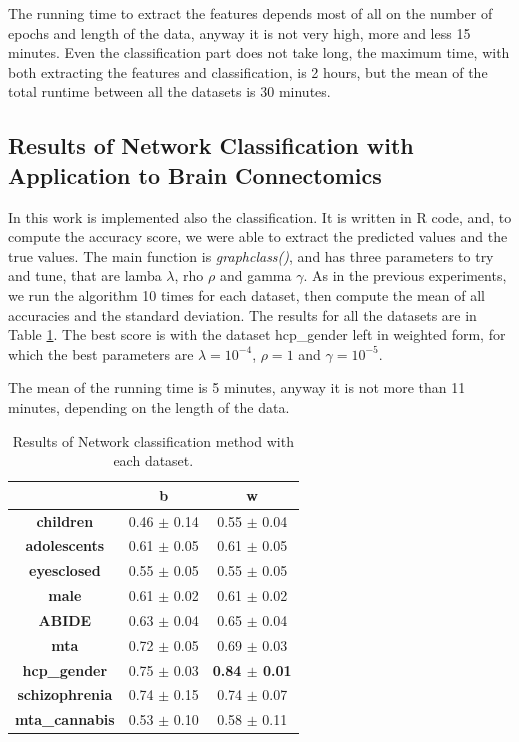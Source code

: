 The running time to extract the features depends most of all on the number of epochs and length of the data, anyway it is not very high, more and less 15 minutes. Even the classification part does not take long, the maximum time, with both extracting the features and classification, is 2 hours, but the mean of the total runtime between all the datasets is 30 minutes.

\subsection{Results of Network Classification with Application to Brain Connectomics}

In this work is implemented also the classification. It is written in R code, and, to compute the accuracy score, we were able to extract the predicted values and the true values. The main function is \textit{graphclass()}, and has three parameters to try and tune, that are lamba $\lambda$, rho $\rho$ and gamma $\gamma$. As in the previous experiments, we run the algorithm 10 times for each dataset, then compute the mean of all accuracies and the standard deviation. The results for all the datasets are in Table \ref{tab:graphclass}. The best score is with the dataset hcp\_gender left in weighted form, for which the best parameters are $\lambda = 10^{-4} $, $\rho = 1$ and $\gamma = 10^{-5}$. 
\vspace{0.5cm}

The mean of the running time is 5 minutes, anyway it is not more than 11 minutes, depending on the length of the data. 

\begin{table}
	\centering
	\begin{tabular}{c|l|c} 
		\toprule
		& \multicolumn{1}{c|}{b} & w                \\ 
		\midrule
		\textbf{children}      & 0.46 $\pm$ 0.14        & 0.55 $\pm$ 0.04  \\
		\textbf{adolescents}   & 0.61 $\pm$ 0.05        & 0.61 $\pm$ 0.05  \\
		\textbf{eyesclosed}    & 0.55 $\pm$ 0.05        & 0.55 $\pm$ 0.05  \\
		\textbf{male}          & 0.61 $\pm$ 0.02        & 0.61 $\pm$ 0.02  \\
		\textbf{ABIDE}         & 0.63 $\pm$ 0.04        & 0.65 $\pm$ 0.04  \\
		\textbf{mta}           & 0.72 $\pm$ 0.05        & 0.69 $\pm$ 0.03  \\
		\textbf{hcp\_gender}   & 0.75 $\pm$ 0.03        & \textbf{0.84 $\pm$ 0.01}  \\
		\textbf{schizophrenia} & 0.74 $\pm$ 0.15        & 0.74 $\pm$ 0.07  \\
		\textbf{mta\_cannabis} & 0.53 $\pm$ 0.10        & 0.58 $\pm$ 0.11 
	\end{tabular}
\caption{Results of Network classification method with each dataset.}
\label{tab:graphclass}
\end{table}

